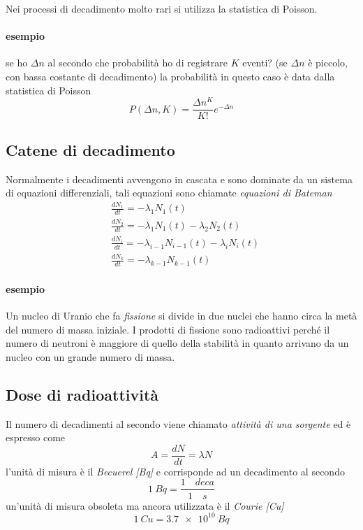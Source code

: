 Nei processi di decadimento molto rari si utilizza la statistica di Poisson.
\paragraph{esempio} se ho $\Delta n$ al secondo che probabilità ho di registrare $K$ eventi? (se $\Delta n$ è piccolo, con bassa costante di decadimento) la probabilità in questo caso è data dalla statistica di Poisson
\begin{equation}
P(\Delta n, K) = \frac{\Delta n^K}{K!} e^{ -\Delta n }
\end{equation}

\subsection{Catene di decadimento}
Normalmente i decadimenti avvengono in cascata e sono dominate da un sistema di equazioni differenziali, tali equazioni sono chiamate \emph{equazioni di Bateman}
\begin{equation}
\begin{split}
& \frac{dN_1}{dt} = - \lambda_1 N_1(t) \\
& \frac{dN_2}{dt} = - \lambda_1 N_1(t) - \lambda_2 N_2(t) \\
& \frac{dN_i}{dt} = - \lambda_{i-1} N_{i-1}(t) - \lambda_i N_i(t) \\
& \frac{dN_k}{dt} = - \lambda_{k-1} N_{k-1}(t)
\end{split}
\label{bateman_equations}
\end{equation}

\paragraph{esempio} Un nucleo di Uranio che fa \emph{fissione} si divide in due nuclei che hanno circa la metà del numero di massa iniziale. I prodotti di fissione sono radioattivi perché il numero di neutroni è maggiore di quello della stabilità in quanto arrivano da un nucleo con un grande numero di massa.

\subsection{Dose di radioattività}
Il numero di decadimenti al secondo viene chiamato \emph{attività di una sorgente} ed è espresso come 
$$ A = \frac{dN}{dt} = \lambda N $$ 
l'unità di misura è il \emph{Becuerel [Bq]} e corrisponde ad un decadimento al secondo
$$ \SI{1}{Bq} = \frac{1 \quad deca}{1 \quad s} $$
un'unità di misura obsoleta ma ancora utilizzata è il \emph{Courie [Cu]}
$$ \SI{1}{Cu} = \SI{3.7e10}{Bq} $$

